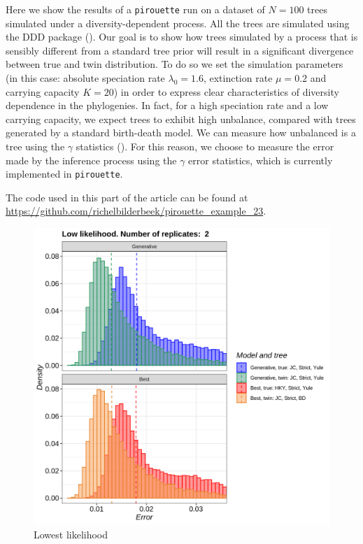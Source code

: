
Here we show the results of a \verb;pirouette; run on a dataset 
of $N = 100$  
trees simulated under a diversity-dependent process. 
All the trees are simulated using the DDD package (\cite{DDD}). 
Our goal is to show how trees simulated by a process that is 
sensibly different from a standard tree prior will result in a 
significant divergence between true and twin distribution. 
To do so we set the simulation parameters (in this case: 
absolute speciation rate $\lambda_0 = 1.6$, 
extinction rate $\mu = 0.2$ and carrying capacity $K = 20$) 
in order to express clear characteristics of diversity dependence in the 
phylogenies. In fact, for a high speciation rate and a low carrying capacity, 
we expect trees to exhibit high unbalance, compared with trees generated 
by a standard birth-death model. 
We can measure how unbalanced is a tree using the $\gamma$ 
statistics (\cite{pybus2000testing}). For this reason, we choose to 
measure the error made by the inference process using the $\gamma$ error statistics, 
which is currently implemented in \verb;pirouette;.

The code used in this part of the article can be found at 
\url{https://github.com/richelbilderbeek/pirouette_example_23}.

\begin{figure}[H]
  \includegraphics[width=\textwidth]{pirouette_example_23/errors_low.png}
  \caption{Lowest likelihood}
\end{figure}

